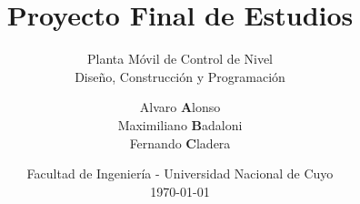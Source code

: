 
\title[{\makebox[.5\paperwidth]{PFE: Planta Móvil de Control de Nivel\hfill%
       \insertframenumber/\inserttotalframenumber}}]{Proyecto Final de Estudios}

\subtitle{Planta Móvil de Control de Nivel\\Diseño, Construcción y
Programación}
\author{\texorpdfstring{Alvaro \textbf{A}lonso\\
			Maximiliano \textbf{B}adaloni\\
			Fernando \textbf{C}ladera}
			{Alonso Badaloni Cladera}
	}


\date{
  \scriptsize Facultad de Ingeniería - Universidad Nacional de Cuyo
  \\
  \vspace{.10cm}
  \today
}
